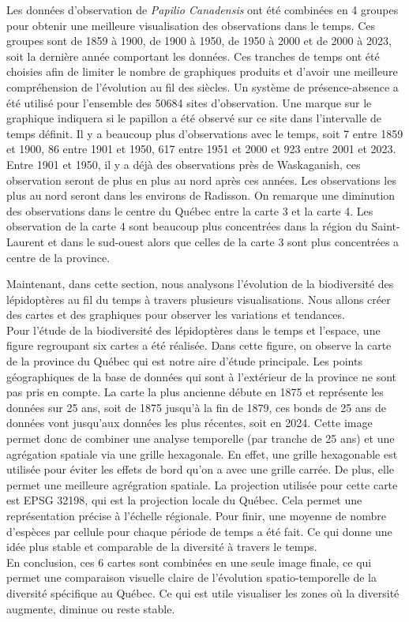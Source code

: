 \documentclass[9pt,twocolumn,twoside,]{pnas-new}
\begin{document}
Les données d'observation de \emph{Papilio Canadensis} ont été combinées
en 4 groupes pour obtenir une meilleure visualisation des observations
dans le temps. Ces groupes sont de 1859 à 1900, de 1900 à 1950, de 1950
à 2000 et de 2000 à 2023, soit la dernière année comportant les données.
Ces tranches de temps ont été choisies afin de limiter le nombre de
graphiques produits et d'avoir une meilleure compréhension de
l'évolution au fil des siècles. Un système de présence-absence a été
utilisé pour l'ensemble des 50684 sites d'observation. Une marque sur le
graphique indiquera si le papillon a été observé sur ce site dans
l'intervalle de temps définit. Il y a beaucoup plus d'observations avec
le temps, soit 7 entre 1859 et 1900, 86 entre 1901 et 1950, 617 entre
1951 et 2000 et 923 entre 2001 et 2023. Entre 1901 et 1950, il y a déjà
des observations près de Waskaganish, ces observation seront de plus en
plus au nord après ces années. Les observations les plus au nord seront
dans les environs de Radisson. On remarque une diminution des
observations dans le centre du Québec entre la carte 3 et la carte 4.
Les observation de la carte 4 sont beaucoup plus concentrées dans la
région du Saint-Laurent et dans le sud-ouest alors que celles de la
carte 3 sont plus concentrées a centre de la province.

Maintenant, dans cette section, nous analysons l'évolution de la
biodiversité des lépidoptères au fil du temps à travers plusieurs
visualisations. Nous allons créer des cartes et des graphiques pour
observer les variations et tendances.\\
Pour l'étude de la biodiversité des lépidoptères dans le temps et
l'espace, une figure regroupant six cartes a été réalisée. Dans cette
figure, on observe la carte de la province du Québec qui est notre aire
d'étude principale. Les points géographiques de la base de données qui
sont à l'extérieur de la province ne sont pas pris en compte. La carte
la plus ancienne débute en 1875 et représente les données sur 25 ans,
soit de 1875 jusqu'à la fin de 1879, ces bonds de 25 ans de données vont
jusqu'aux données les plus récentes, soit en 2024. Cette image permet
donc de combiner une analyse temporelle (par tranche de 25 ans) et une
agrégation spatiale via une grille hexagonale. En effet, une grille
hexagonable est utilisée pour éviter les effets de bord qu'on a avec une
grille carrée. De plus, elle permet une meilleure agrégration spatiale.
La projection utilisée pour cette carte est EPSG 32198, qui est la
projection locale du Québec. Cela permet une représentation précise à
l'échelle régionale. Pour finir, une moyenne de nombre d'espèces par
cellule pour chaque période de temps a été fait. Ce qui donne une idée
plus stable et comparable de la diversité à travers le temps.\\
En conclusion, ces 6 cartes sont combinées en une seule image finale, ce
qui permet une comparaison visuelle claire de l'évolution
spatio-temporelle de la diversité spécifique au Québec. Ce qui est utile
visualiser les zones où la diversité augmente, diminue ou reste stable.
\end{document}
